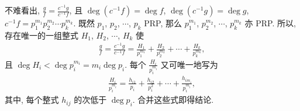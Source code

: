 \begin{pf}
    不难看出, $\frac{g}{f} = \frac{c^{-1} g}{c^{-1} f}$, 且 $\deg {(c^{-1} f)} = \deg f$, $\deg {(c^{-1} g)} = \deg g$, $c^{-1} f = p_1^{m_1} p_2^{m_2} \cdots p_k^{m_k}$. 既然 $p_1$, $p_2$, $\cdots$, $p_k$ PRP, 那么 $p_1^{m_1}$, $p_2^{m_2}$, $\cdots$, $p_k^{m_k}$ 亦 PRP. 所以, 存在唯一的一组整式 $H_1$, $H_2$, $\cdots$, $H_k$ 使
    \begin{align*}
        \frac{g}{f} = \frac{c^{-1} g}{c^{-1} f} = \frac{H_1}{p_1^{m_1}} + \frac{H_2}{p_2^{m_2}} + \cdots + \frac{H_k}{p_k^{m_k}},
    \end{align*}
    且 $\deg H_i < \deg p_i^{m_i} = m_i \deg p_i$. 每个 $\frac{H_i}{p_i^{m_i}}$ 又可唯一地写为
    \begin{align*}
        \frac{H_i}{p_i^{m_i}} = \frac{h_{i1}}{p_i} + \frac{h_{i2}}{p_i^2} + \cdots + \frac{h_{im_i}}{p_i^{m_i}},
    \end{align*}
    其中, 每个整式 $h_{ij}$ 的次低于 $\deg p_i$. 合并这些式即得结论.
\end{pf}



